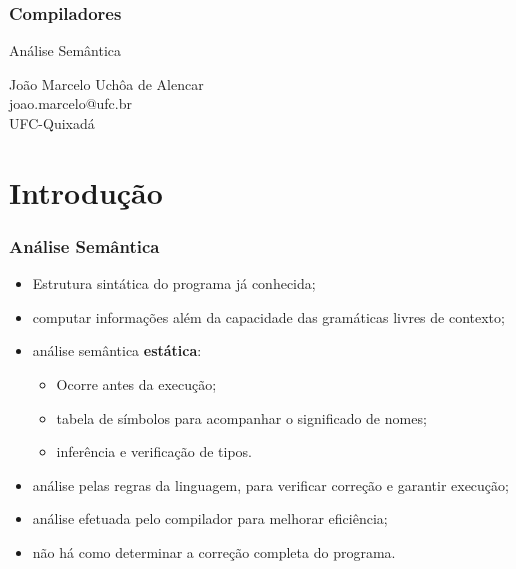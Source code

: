 \documentclass[table]{beamer}
\begin{document}
\begin{frame}
   \frametitle{Compiladores}
   \large
   \begin{center}
   Análise Semântica
   \end{center}
   \scriptsize
   \begin{center}
      João Marcelo Uchôa de Alencar \\
      joao.marcelo@ufc.br \\
      UFC-Quixadá
   \end{center}
\end{frame}

\begin{frame}
   \tableofcontents
\end{frame}

\section{Introdução}
\begin{frame}
   \frametitle{Análise Semântica}
   \begin{itemize}
      \item Estrutura sintática do programa já conhecida;
      \item computar informações além da capacidade das gramáticas livres de contexto;
      \item análise semântica \textbf{estática}: 
      \begin{itemize}
         \item Ocorre antes da execução;
         \item tabela de símbolos para acompanhar o significado de nomes;
	 \item inferência e verificação de tipos.
      \end{itemize}
      \item análise pelas regras da linguagem, para verificar correção e garantir execução;
      \item análise efetuada pelo compilador para melhorar eficiência;
      \item não há como determinar a correção completa do programa.
   \end{itemize}
\end{frame}
\end{document}
